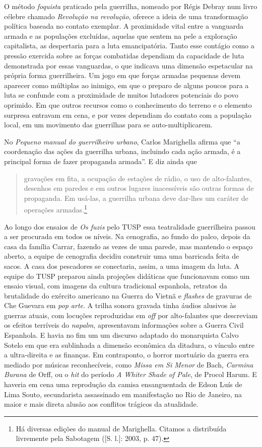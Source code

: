 O método \textit{foquista} praticado pela guerrilha, nomeado por Régis
Debray num livro célebre chamado \textit{Revolução na revolução}, oferece a
ideia de uma transformação política baseada no contato exemplar. A
proximidade vital entre a vanguarda armada e as populações excluídas,
aquelas que sentem na pele a exploração capitalista, as despertaria para
a luta emancipatória. Tanto esse contágio como a pressão exercida sobre
as forças combatidas dependiam da capacidade de luta demonstrada por
essas vanguardas, o que indicava uma dimensão espetacular na própria
forma guerrilheira. Um jogo em que forças armadas pequenas devem
aparecer como múltiplas ao inimigo, em que o preparo de alguns poucos
para a luta se confunde com a proximidade de muitos lutadores potenciais
do povo oprimido. Em que outros recursos como o conhecimento do terreno
e o elemento surpresa entravam em cena, e por vezes dependiam do contato
com a população local, em um movimento das guerrilhas para se
auto-multiplicarem.

No \textit{Pequeno manual do guerrilheiro urbano}, Carlos Marighella afirma
que “a coordenação das ações da guerrilha urbana, incluindo cada ação
armada, é a principal forma de fazer propaganda armada”. E diz ainda que

\begin{quote}
gravações em fita, a ocupação de estações de rádio, o uso de
alto-falantes, desenhos em paredes e em outros lugares inacessíveis são
outras formas de propaganda. Em usá-las, a guerrilha urbana deve
dar-lhes um caráter de operações armadas.\footnote{Há diversas edições
  do manual de Marighella. Citamos a distribuída livremente pela
  Sabotagem ({[}S. l.{]}: 2003, p. 47).}
\end{quote}

Ao longo dos ensaios de \textit{Os fuzis} pelo TUSP essa teatralidade
guerrilheira passou a ser procurada em todos os níveis. Na cenografia,
ao fundo do palco, depois da casa da família Carrar, fazendo as vezes de
uma parede, mas mantendo o espaço aberto, a equipe de cenografia decidiu
construir uma uma barricada feita de sacos. A casa dos pescadores se
conectaria, assim, a uma imagem da luta. A equipe do TUSP preparou ainda
projeções didáticas que funcionavam como um ensaio visual, com imagens
da cultura tradicional espanhola, retratos da brutalidade do exército
americano na Guerra do Vietnã e \textit{flashes} de gravuras de Che Guevara
em \textit{pop arte}. A trilha sonora gravada tinha áudios alusivos às
guerras atuais, com locuções reproduzidas em \textit{off} por alto-falantes
que descreviam os efeitos terríveis do \textit{napalm}, apresentavam
informações sobre a Guerra Civil Espanhola. E havia no fim um um
discurso adaptado do monarquista Calvo Sotelo em que era sublinhada a
dimensão econômica da ditadura, o vínculo entre a ultra-direita e as
finanças. Em contraponto, o horror mortuário da guerra era mediado por
músicas reconhecíveis, como \textit{Missa em Si Menor} de Bach,
\textit{Carmina Burana} de Orff, ou o \textit{hit} do período \textit{A Whiter
Shade of Pale}, de Procol Harum. E haveria em cena uma reprodução da
camisa ensanguentada de Edson Luís de Lima Souto, secundarista
assassinado em manifestação no Rio de Janeiro, na maior e mais direta
alusão aos conflitos trágicos da atualidade.

